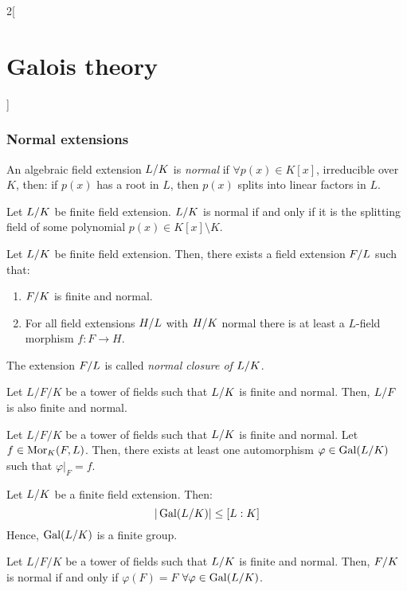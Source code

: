 \documentclass[../../../main.tex]{subfiles}
\begin{document}
\begin{multicols}{2}[\section{Galois theory}]
  \subsubsection{Normal extensions}
  \begin{definition}
    An algebraic field extension $\quot{L}{K}$ is \textit{normal} if $\forall p(x)\in K[x]$, irreducible over $K$, then: if $p(x)$ has a root in $L$, then $p(x)$ splits into linear factors in $L$.
  \end{definition}
  \begin{theorem}
    Let $\quot{L}{K}$ be finite field extension. $\quot{L}{K}$ is normal if and only if it is the splitting field of some polynomial $p(x)\in K[x]\setminus K$.
  \end{theorem}
  \begin{corollary}
    Let $\quot{L}{K}$ be finite field extension. Then, there exists a field extension $\quot{F}{L}$ such that:
    \begin{enumerate}
      \item $\quot{F}{K}$ is finite and normal.
      \item For all field extensions $\quot{H}{L}$ with $\quot{H}{K}$ normal there is at least a $L$-field morphism $f:F\rightarrow H$.
    \end{enumerate}
    The extension $\quot{F}{L}$ is called \textit{normal closure of $\quot{L}{K}$}.
  \end{corollary}
  \begin{corollary}
    Let $L/F/K$ be a tower of fields such that $\quot{L}{K}$ is finite and normal. Then, $\quot{L}{F}$ is also finite and normal.
  \end{corollary}
  \begin{corollary}
    Let $L/F/K$ be a tower of fields such that $\quot{L}{K}$ is finite and normal. Let $f\in\operatorname{Mor}_K(F,L)$. Then, there exists at least one automorphism $\varphi\in\Gal(\quot{L}{K})$ such that $\varphi|_F=f$.
  \end{corollary}
  \begin{corollary}
    Let $\quot{L}{K}$ be a finite field extension. Then: $$\textstyle|\Gal(\quot{L}{K})|\leq[L:K]$$ Hence, $\Gal(\quot{L}{K})$ is a finite group.
  \end{corollary}
  \begin{corollary}
    Let $L/F/K$ be a tower of fields such that $\quot{L}{K}$ is finite and normal. Then, $\quot{F}{K}$ is normal if and only if $\varphi(F)=F$ $\forall\varphi\in\Gal(\quot{L}{K})$.
  \end{corollary}

\end{multicols}
\end{document}

